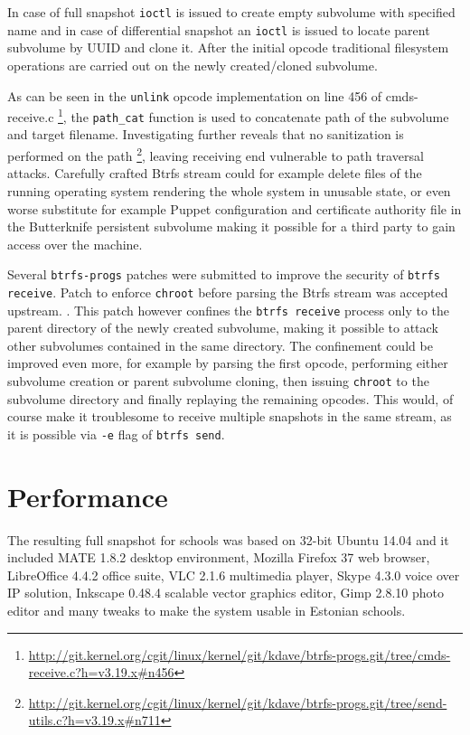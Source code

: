 \documentclass[a4paper,11pt]{kth-mag}
\begin{document}
In case of full snapshot \texttt{ioctl} is issued to
create empty subvolume with specified name and
in case of differential snapshot an \texttt{ioctl} is issued
to locate parent subvolume by UUID and clone it.
After the initial opcode traditional filesystem
operations are carried out on the newly
created/cloned subvolume.

As can be seen in the \texttt{unlink} opcode
implementation on line 456 of cmds-receive.c
\footnote{\url{http://git.kernel.org/cgit/linux/kernel/git/kdave/btrfs-progs.git/tree/cmds-receive.c?h=v3.19.x\#n456}},
the \texttt{path\_cat} function is used to concatenate
path of the subvolume and target filename.
Investigating further reveals that no sanitization is performed on the path
\footnote{\url{http://git.kernel.org/cgit/linux/kernel/git/kdave/btrfs-progs.git/tree/send-utils.c?h=v3.19.x\#n711}}, leaving receiving end vulnerable to path traversal attacks.
Carefully crafted Btrfs stream could for example delete files
of the running operating system rendering the whole system
in unusable state, or even worse substitute for example
Puppet configuration and certificate authority file in the
Butterknife persistent subvolume making it possible for a third party
to gain access over the machine.

Several \texttt{btrfs-progs} patches were submitted to improve
the security of \texttt{btrfs receive}.
Patch to enforce \texttt{chroot}
before parsing the Btrfs stream was accepted upstream.
\cite{btrfs-progs-optionally-enforce-chroot-for-btrfs-receive}.
This patch however confines the \texttt{btrfs receive}
process only to the parent directory of the newly created subvolume,
making it possible to attack other subvolumes contained in the same directory.
The confinement could be improved even more, for example
by parsing the first opcode, performing either
subvolume creation or parent subvolume cloning,
then issuing \texttt{chroot} to the subvolume directory
and finally replaying the remaining opcodes.
This would, of course make it troublesome to receive multiple
snapshots in the same stream, as it is possible via \texttt{-e}
flag of \texttt{btrfs send}.


\section{Performance}

The resulting full snapshot for schools was based on 32-bit Ubuntu 14.04 and
it included MATE 1.8.2 desktop environment, Mozilla Firefox 37 web browser,
LibreOffice 4.4.2 office suite,
VLC 2.1.6 multimedia player,
Skype 4.3.0 voice over IP solution,
Inkscape 0.48.4 scalable vector graphics editor,
Gimp 2.8.10 photo editor and many tweaks
to make the system usable in Estonian schools.
\end{document}
